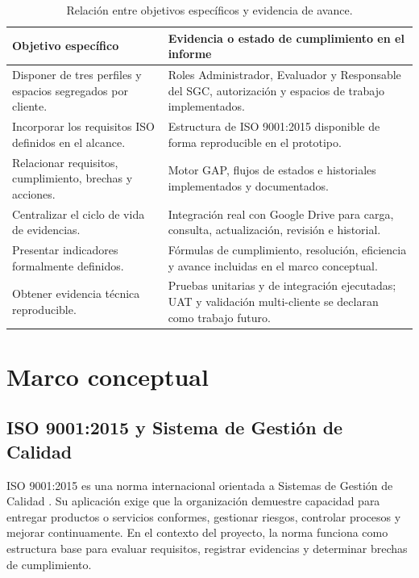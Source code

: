 \documentclass[final]{udpthesis}
\begin{document}
\begin{table}[H]
\centering
\small
\begin{tabularx}{\textwidth}{|Y|Y|}
\hline
{}\textbf{Objetivo específico} & \textbf{Evidencia o estado de cumplimiento en el informe} \\ \hline
Disponer de tres perfiles y espacios segregados por cliente. & Roles Administrador, Evaluador y Responsable del SGC, autorización y espacios de trabajo implementados. \\ \hline
Incorporar los requisitos ISO definidos en el alcance. & Estructura de ISO 9001:2015 disponible de forma reproducible en el prototipo. \\ \hline
Relacionar requisitos, cumplimiento, brechas y acciones. & Motor GAP, flujos de estados e historiales implementados y documentados. \\ \hline
Centralizar el ciclo de vida de evidencias. & Integración real con Google Drive para carga, consulta, actualización, revisión e historial. \\ \hline
Presentar indicadores formalmente definidos. & Fórmulas de cumplimiento, resolución, eficiencia y avance incluidas en el marco conceptual. \\ \hline
Obtener evidencia técnica reproducible. & Pruebas unitarias y de integración ejecutadas; UAT y validación multi-cliente se declaran como trabajo futuro. \\ \hline
\end{tabularx}
\normalsize
\caption{Relación entre objetivos específicos y evidencia de avance.}
\label{tab:objetivos-evidencia}
\end{table}

\chapter{Marco conceptual}

\section{ISO 9001:2015 y Sistema de Gestión de Calidad}

ISO 9001:2015 es una norma internacional orientada a Sistemas de Gestión de Calidad \cite{iso9001}. Su aplicación exige que la organización demuestre capacidad para entregar productos o servicios conformes, gestionar riesgos, controlar procesos y mejorar continuamente. En el contexto del proyecto, la norma funciona como estructura base para evaluar requisitos, registrar evidencias y determinar brechas de cumplimiento.
\end{document}
